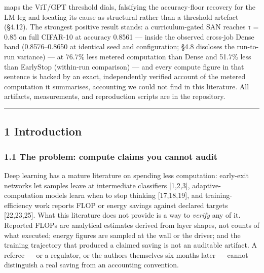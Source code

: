 \documentclass[
]{article}
\begin{document}
maps the ViT/GPT threshold dials, falsifying the accuracy-floor recovery
for the LM leg and locating its cause as structural rather than a
threshold artefact (§4.12). The strongest positive result stands: a
curriculum-gated SAN reaches τ = 0.85 on full CIFAR-10 at accuracy
0.8561 --- inside the observed cross-job Dense band (0.8576--0.8650 at
identical seed and configuration; §4.8 discloses the run-to-run
variance) --- at 76.7\% less metered computation than Dense and 51.7\%
less than EarlyStop (within-run comparison) --- and every compute figure
in that sentence is backed by an exact, independently verified account
of the metered computation it summarises, accounting we could not find
in this literature. All artifacts, measurements, and reproduction
scripts are in the repository.

\begin{center}\rule{0.5\linewidth}{0.5pt}\end{center}

\hypertarget{introduction}{%
\subsection{1 Introduction}\label{introduction}}

\hypertarget{the-problem-compute-claims-you-cannot-audit}{%
\subsubsection{1.1 The problem: compute claims you cannot
audit}\label{the-problem-compute-claims-you-cannot-audit}}

Deep learning has a mature literature on spending less computation:
early-exit networks let samples leave at intermediate classifiers
{[}1,2,3{]}, adaptive-computation models learn when to stop thinking
{[}17,18,19{]}, and training-efficiency work reports FLOP or energy
savings against declared targets {[}22,23,25{]}. What this literature
does not provide is a way to \emph{verify} any of it. Reported FLOPs are
analytical estimates derived from layer shapes, not counts of what
executed; energy figures are sampled at the wall or the driver; and the
training trajectory that produced a claimed saving is not an auditable
artifact. A referee --- or a regulator, or the authors themselves six
months later --- cannot distinguish a real saving from an accounting
convention.
\end{document}
